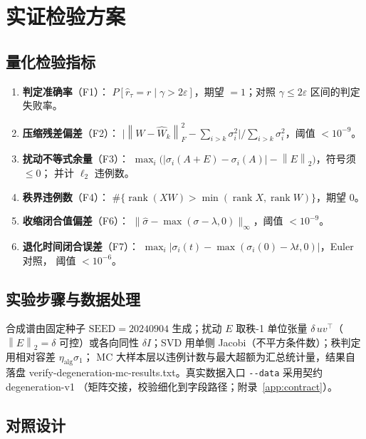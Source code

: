 \documentclass[UTF8,11pt,a4paper]{ctexart}
\theoremstyle{plain}
\theoremstyle{definition}
\theoremstyle{remark}
\newcommand{\rank}{\operatorname{rank}}
\newcommand{\Fnorm}[1]{\left\lVert #1\right\rVert_F}
\newcommand{\Tnorm}[1]{\left\lVert #1\right\rVert_2}
\begin{document}
\section{实证检验方案}\label{sec:protocol}

\subsection{量化检验指标}

\begin{enumerate}
\item \textbf{判定准确率}（F1）：
  $P[\hat r_\tau=r\mid\gamma>2\varepsilon]$，期望 $=1$；对照
  $\gamma\le2\varepsilon$ 区间的判定失败率。
\item \textbf{压缩残差偏差}（F2）：
  $\big|\Fnorm{W-\hat W_k}^2-\sum_{i>k}\sigma_i^2\big|
  \big/\sum_{i>k}\sigma_i^2$，阈值 $<10^{-9}$。
\item \textbf{扰动不等式余量}（F3）：
  $\max_i\big(|\sigma_i(A{+}E)-\sigma_i(A)|-\Tnorm{E}\big)$，符号须 $\le0$；
  并计 $\ell_2$ 违例数。
\item \textbf{秩界违例数}（F4）：
  $\#\{\rank(XW)>\min(\rank X,\rank W)\}$，期望 $0$。
\item \textbf{收缩闭合值偏差}（F6）：
  $\|\hat\sigma-\max(\sigma-\lambda,0)\|_\infty$，阈值 $<10^{-9}$。
\item \textbf{退化时间闭合误差}（F7）：
  $\max_i|\sigma_i(t)-\max(\sigma_i(0)-\lambda t,0)|$，Euler 对照，
  阈值 $<10^{-6}$。
\end{enumerate}

\subsection{实验步骤与数据处理}

合成谱由固定种子 $\mathrm{SEED}=20240904$ 生成；扰动 $E$ 取秩-1 单位张量
$\delta\,uv^\top$（$\Tnorm{E}=\delta$ 可控）或各向同性 $\delta I$；SVD 用单侧
Jacobi（不平方条件数）；秩判定用相对容差 $\eta_{\mathrm{alg}}\sigma_1$；
MC 大样本层以违例计数与最大超额为汇总统计量，结果自落盘
\textsf{verify-degeneration-mc-results.txt}。真实数据入口
\texttt{-{}-data} 采用契约 \textsf{degeneration-v1}
（矩阵交接，校验细化到字段路径；附录~\ref{app:contract}）。

\subsection{对照设计}
\end{document}
